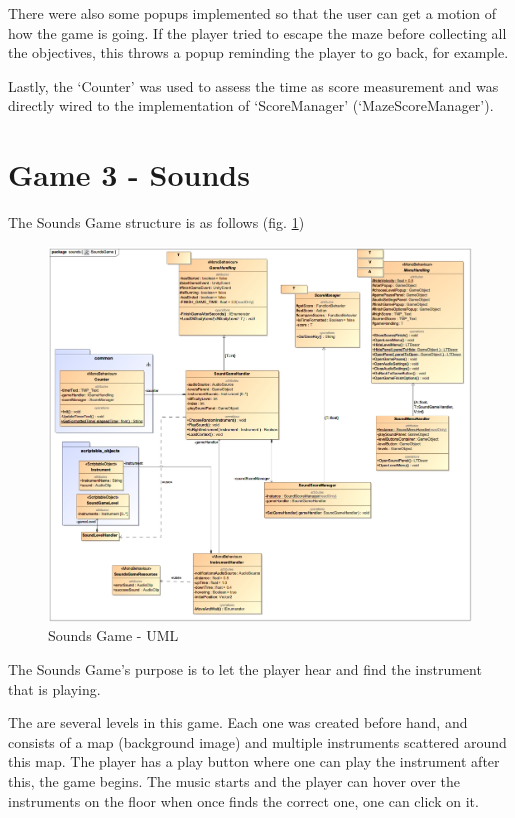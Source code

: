 There were also some popups implemented so that the user can get a motion of how the game is going. If the player tried to escape the maze before collecting all the objectives, this throws a popup reminding the player to go back, for example.

Lastly, the `Counter' was used to assess the time as score measurement and was directly wired to the implementation of `ScoreManager' (`MazeScoreManager').

\newpage
\section{Game 3 - Sounds}

The Sounds Game structure is as follows (fig. \ref*{fig:soundsGameArq})

\begin{figure}[!h]
    \centering
    \includegraphics[scale=0.35]{Chapters/arq/SoundsGame.jpg}
    \caption{Sounds Game - UML}
    \label{fig:soundsGameArq}
\end{figure}

The Sounds Game's purpose is to let the player hear and find the instrument that is playing.

The are several levels in this game. Each one was created before hand, and consists of a map (background image) and multiple instruments scattered around this map. The player has a play button where one can play the instrument after this, the game begins. The music starts and the player can hover over the instruments on the floor when once finds the correct one, one can click on it.

